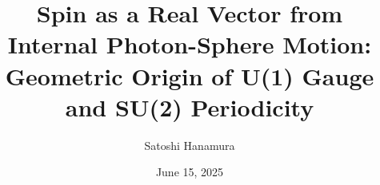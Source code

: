 \documentclass[%
 reprint,
 amsmath,amssymb,
 aps,
]{revtex4-1}
\numberwithin{equation}{section}%
\begin{document}


\title{Spin as a Real Vector from Internal Photon-Sphere Motion:\\ Geometric Origin of U(1) Gauge and SU(2) Periodicity}
\author{Satoshi Hanamura}
\date{June 15, 2025}



% 


\end{document}
